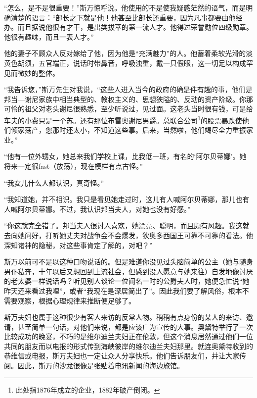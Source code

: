 \par “怎么，是不是很重要！”斯万惊呼说。他使用的不是使我疑惑茫然的语气，而是明确清楚的语言：“部长之下就是他！他甚至比部长还重要，因为凡事都要由他经办。而且据说他很有才干，是出类拔萃的第一流人才。他得过荣誉勋位四级勋章。他很有趣味，而且一表人才。”
\par 他的妻子不顾众人反对嫁给了他，因为他是“充满魅力”的人。他蓄着柔软光滑的淡黄色胡须，五官端正，说话时带鼻音，呼吸浊重，戴一只假眼，这一切足以构成罕见而微妙的整体。
\par “我告诉您，”斯万先生对我说，“这些人进入当今的政府的确是件有趣的事，他们是邦当—谢尼家族中相当典型的、教权主义的、思想狭隘的、反动的资产阶级。你那可怜的祖父对老头谢尼很熟悉，至少听说过，见过面。这老头当时很有钱，可是给车夫的小费只是一个苏。还有那位布雷奥谢尼男爵。总联合公司\footnote{此处指1876年成立的企业，1882年破产倒闭。}的股票暴跌使他们倾家荡产，您那时还太小，不知道这些事。后来，当然啦，他们竭尽全力重振家业。”
\par “他有一位外甥女，她总来我们学校上课，比我低一班，有名的‘阿尔贝蒂娜’。她将来一定很fast（放荡），现在模样有点古怪。”
\par “我女儿什么人都认识，真奇怪。”
\par “我知道她，并不相识。我只是看见她走过时，这儿有人喊阿尔贝蒂娜，那儿也有人喊阿尔贝蒂娜。不过，我认识邦当夫人，对她也没有好感。”
\par “你这就完全错了。邦当夫人很讨人喜欢，她漂亮、聪明，而且颇有风趣。我这就去向她问好，打听她丈夫对战争会不会爆发，狄奥多西国王可靠不可靠的看法。他深知诸神的隐秘，对这些事肯定了解的，对吧？”
\par 斯万以前可不是以这种口吻说话的。但是难道你没见过头脑简单的公主（她与随身男仆私奔，十年以后又想回到上流社会，但感到没人愿意与她来往）自发地像讨厌的老太婆一样说话吗？听见别人谈论一位闻名一时的公爵夫人时，她便急忙说“她昨天还来看过我哩”，或者“我现在是深居简出了”。因此我们要了解风俗，根本不需要观察，根据心理规律来推断便足够了。
\par 斯万夫妇也属于这种很少有客人来访的反常人物。稍稍有点身份的某人的来访、邀请，甚至简单一句话，对他们来说，都是应该广为宣传的大事。奥黛特举行了一次比较成功的晚宴，不巧的是维尔迪兰夫妇正在伦敦，但这个消息居然通过他们一位共同的朋友而以电报的形式传到海峡彼岸的维尔迪兰夫妇那里。就连奥黛特收到的恭维信或电报，斯万夫妇也一定让众人分享快乐。他们告诉朋友们，并让大家传阅。因此，斯万的沙龙很像是张贴着电讯新闻的海边旅馆。
